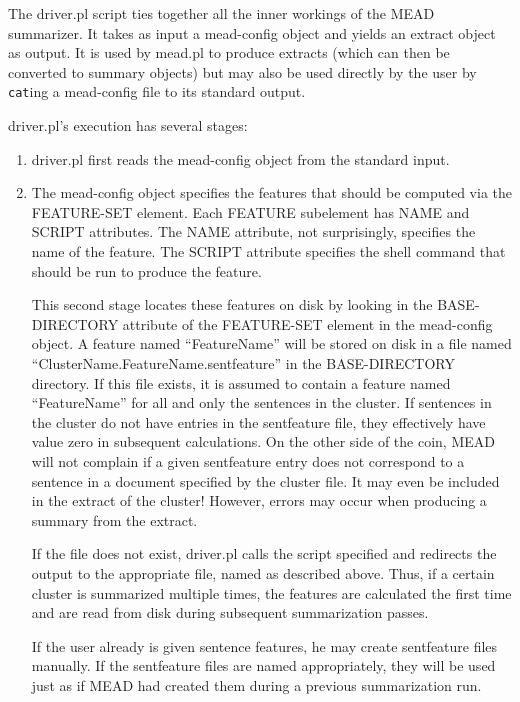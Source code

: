 \documentclass[10pt]{article}
\begin{document}
The driver.pl script ties together all the inner workings of
the MEAD summarizer.  It takes as input a mead-config object
and yields an extract object as output.  It is used by mead.pl
to produce extracts (which can then be converted to 
summary objects) but may also be used directly by the user
by \verb|cat|ing a mead-config file to its standard output.

driver.pl's execution has several stages:

\begin{enumerate}

\item 
driver.pl first reads the mead-config object from the standard input.  

\item 
The mead-config object specifies the features that should be 
computed via the FEATURE-SET element.  Each FEATURE subelement
has NAME and SCRIPT attributes.  The NAME attribute, not 
surprisingly, specifies the name of the feature.  The SCRIPT
attribute specifies the shell command that should be run to
produce the feature.
 
This second stage locates these features on disk
by looking in the BASE-DIRECTORY attribute of the FEATURE-SET
element in the mead-config object.  A feature named ``FeatureName''
will be stored on disk in a file named
``ClusterName.FeatureName.sentfeature'' in the BASE-DIRECTORY
directory.  If this file exists, it is assumed to contain a
feature named ``FeatureName'' for all and only the sentences
in the cluster.  If sentences in the cluster do not have entries
in the sentfeature file, they effectively have value zero in
subsequent calculations.  On the other side of the coin, MEAD
will not complain if a given sentfeature entry does not 
correspond to a sentence in a document specified by the cluster
file.  It may even be included in the extract of the cluster!
However, errors may occur when producing a summary from the
extract.

If the file does not exist, driver.pl calls the script specified
and redirects the output to the appropriate file, named as
described above.  Thus, if a certain cluster is summarized 
multiple times, the features are calculated the first time and
are read from disk during subsequent summarization passes.

If the user already is given sentence features, he may create
sentfeature files manually.  If the sentfeature files are 
named appropriately, they will be used just as if MEAD had
created them during a previous summarization run.


\end{enumerate}
\end{document}
